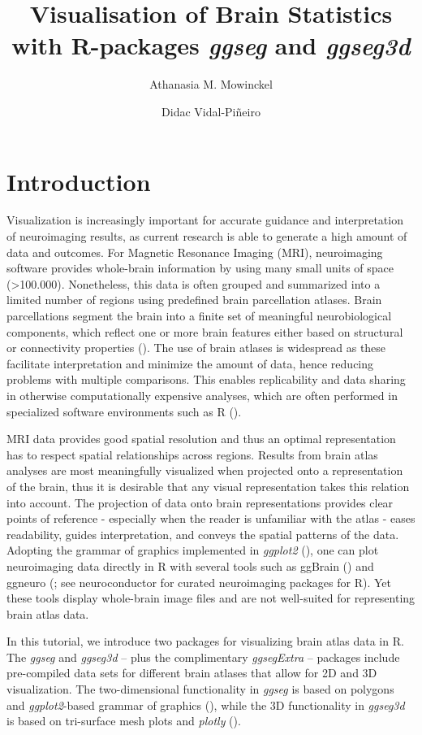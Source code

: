\documentclass[fleqn,10pt]{wlpeerj} %
\title{Visualisation of Brain Statistics with R-packages \emph{ggseg} and \emph{ggseg3d}}
\author[1]{Athanasia M. Mowinckel}
\author[1]{Didac Vidal-Piñeiro}
\affil[1]{Center for Lifespan Changes in Brain and Cognition, University of Oslo, PO. box 1094 Blindern, 0317 Oslo, Norway}
\begin{document}
\flushbottom
\maketitle
\thispagestyle{empty}

\hypertarget{introduction}{%
\section{Introduction}\label{introduction}}

Visualization is increasingly important for accurate guidance and interpretation of neuroimaging results, as current research is able to generate a high amount of data and outcomes.
For Magnetic Resonance Imaging (MRI), neuroimaging software provides whole-brain information by using many small units of space (\textgreater100.000).
Nonetheless, this data is often grouped and summarized into a limited number of regions using predefined brain parcellation atlases.
Brain parcellations segment the brain into a finite set of meaningful neurobiological components, which reflect one or more brain features either based on structural or connectivity properties (\citet{eickhoff_2018}).
The use of brain atlases is widespread as these facilitate interpretation and minimize the amount of data, hence reducing problems with multiple comparisons.
This enables replicability and data sharing in otherwise computationally expensive analyses, which are often performed in specialized software environments such as R (\citet{R}).

MRI data provides good spatial resolution and thus an optimal representation has to respect spatial relationships across regions.
Results from brain atlas analyses are most meaningfully visualized when projected onto a representation of the brain, thus it is desirable that any visual representation takes this relation into account.
The projection of data onto brain representations provides clear points of reference - especially when the reader is unfamiliar with the atlas - eases readability, guides interpretation, and conveys the spatial patterns of the data.
Adopting the grammar of graphics implemented in \emph{ggplot2} (\citet{ggplot}), one can plot neuroimaging data directly in R with several tools such as ggBrain (\citet{ggBrain}) and ggneuro (\citet{ggneuro}; see neuroconductor \citeyearpar{neuroconductor} for curated neuroimaging packages for R).
Yet these tools display whole-brain image files and are not well-suited for representing brain atlas data.

In this tutorial, we introduce two packages for visualizing brain atlas data in R.
The \emph{ggseg} and \emph{ggseg3d} -- plus the complimentary \emph{ggsegExtra} -- packages include pre-compiled data sets for different brain atlases that allow for 2D and 3D visualization.
The two-dimensional functionality in \emph{ggseg} is based on polygons and \emph{ggplot2}-based grammar of graphics (\citet{ggplot}), while the 3D functionality in \emph{ggseg3d} is based on tri-surface mesh plots and \emph{plotly} (\citet{plotly}).
\end{document}
